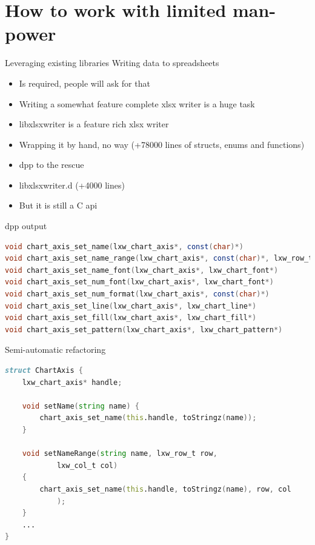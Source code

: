 \documentclass[aspectratio=169,notes]{beamer}
\begin{document}
	\section{How to work with limited man-power}

	\begin{frame}{Leveraging existing libraries}
		\pause
		\large
		Writing data to spreadsheets
		\begin{itemize}
			\item Is required, people will ask for that
			\item Writing a somewhat feature complete xlsx writer is a huge task\\[1cm]
		\end{itemize}
		\begin{itemize}
			\item libxlsxwriter is a feature rich xlsx writer
			\item Wrapping it by hand, \pause no way (+78000 lines of structs, enums and functions)\\[1cm]
			\pause
			\item dpp to the rescue
			\item libxlsxwriter.d (+4000 lines)
			\item But it is still a C api
		\end{itemize}
	\end{frame}

	\begin{frame}[fragile]{dpp output}
		\begin{lstlisting}[language=D,basicstyle=\small\ttfamily]
void chart_axis_set_name(lxw_chart_axis*, const(char)*)
void chart_axis_set_name_range(lxw_chart_axis*, const(char)*, lxw_row_t, lxw_col_t)
void chart_axis_set_name_font(lxw_chart_axis*, lxw_chart_font*)
void chart_axis_set_num_font(lxw_chart_axis*, lxw_chart_font*)
void chart_axis_set_num_format(lxw_chart_axis*, const(char)*)
void chart_axis_set_line(lxw_chart_axis*, lxw_chart_line*)
void chart_axis_set_fill(lxw_chart_axis*, lxw_chart_fill*)
void chart_axis_set_pattern(lxw_chart_axis*, lxw_chart_pattern*)
\end{lstlisting}
	\end{frame}

	\begin{frame}[fragile]{Semi-automatic refactoring}
		\begin{lstlisting}[language=D]
struct ChartAxis {
	lxw_chart_axis* handle;

	void setName(string name) { 
		chart_axis_set_name(this.handle, toStringz(name)); 
	}

	void setNameRange(string name, lxw_row_t row, 
			lxw_col_t col) 
	{
		chart_axis_set_name(this.handle, toStringz(name), row, col
			);
	}
	...
}
\end{lstlisting}
	\end{frame}
\end{document}
